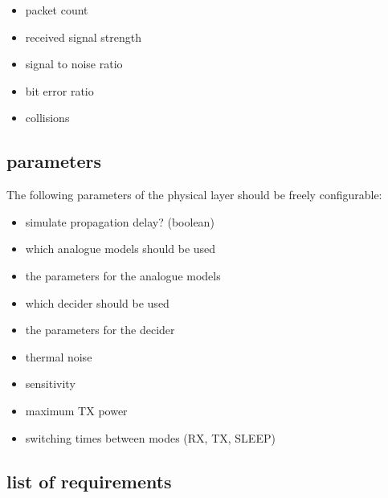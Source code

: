 \begin{itemize}
\item packet count
\item received signal strength
\item signal to noise ratio
\item bit error ratio
\item collisions
\end{itemize}

\subsection{parameters}
\label{parameters}

The following parameters of the physical layer should be freely configurable:

\begin{itemize}
	\item simulate propagation delay? (boolean)
	\item which analogue models should be used
	\item the parameters for the analogue models
	\item which decider should be used
	\item the parameters for the decider
	\item thermal noise
	\item sensitivity
	\item maximum TX power
	\item switching times between modes (RX, TX, SLEEP)
\end{itemize}

\subsection{list of requirements}
\label{requirements}

